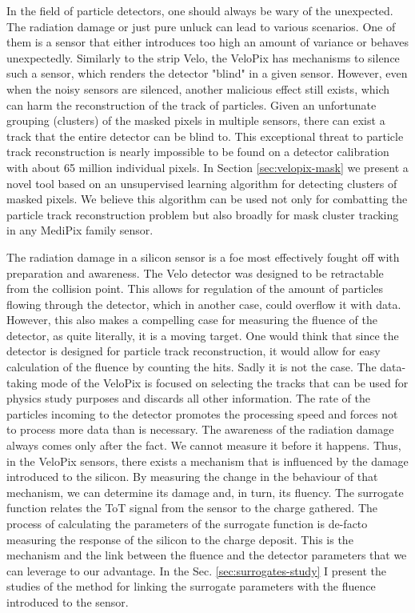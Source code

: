 In the field of particle detectors, one should always be wary of the unexpected. 
The radiation damage or just pure unluck can lead to various scenarios. One of them is a sensor that either introduces too high an amount of variance or behaves unexpectedly.
Similarly to the strip Velo, the VeloPix has mechanisms to silence such a sensor, which renders the detector "blind" in a given sensor.
However, even when the noisy sensors are silenced, another malicious effect still exists, which can harm the reconstruction of the track of particles.
Given an unfortunate grouping (clusters) of the masked pixels in multiple sensors, there can exist a track that the entire detector can be blind to.
This exceptional threat to particle track reconstruction is nearly impossible to be found on a detector calibration with about 65 million individual pixels.
In Section \ref{sec:velopix-mask} we present a novel tool based on an unsupervised learning algorithm for detecting clusters of masked pixels.
We believe this algorithm can be used not only for combatting the particle track reconstruction problem but also broadly for mask cluster tracking in any MediPix family sensor.


The radiation damage in a silicon sensor is a foe most effectively fought off with preparation and awareness.
The Velo detector was designed to be retractable from the collision point. 
This allows for regulation of the amount of particles flowing through the detector, which in another case, could overflow it with data.
However, this also makes a compelling case for measuring the fluence of the detector, as quite literally, it is a moving target.
One would think that since the detector is designed for particle track reconstruction, it would allow for easy calculation of the fluence by counting the hits.
Sadly it is not the case.
The data-taking mode of the VeloPix is focused on selecting the tracks that can be used for physics study purposes and discards all other information.
The rate of the particles incoming to the detector promotes the processing speed and forces not to process more data than is necessary.
The awareness of the radiation damage always comes only after the fact. We cannot measure it before it happens.
Thus, in the VeloPix sensors, there exists a mechanism that is influenced by the damage introduced to the silicon.
By measuring the change in the behaviour of that mechanism, we can determine its damage and, in turn, its fluency.
The surrogate function relates the ToT signal from the sensor to the charge gathered.
The process of calculating the parameters of the surrogate function is de-facto measuring the response of the silicon to the charge deposit. 
This is the mechanism and the link between the fluence and the detector parameters that we can leverage to our advantage.
In the Sec. \ref{sec:surrogates-study} I present the studies of the method for linking the surrogate parameters with the fluence introduced to the sensor.



